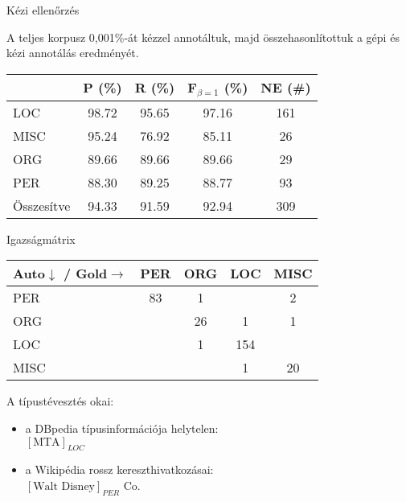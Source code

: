 \documentclass[utf8x,t]{beamer}
\begin{document}
\begin{frame}{Kézi ellenőrzés}

\bigskip

A teljes korpusz 0,001\%-át kézzel annotáltuk, majd összehasonlítottuk a gépi és kézi annotálás eredményét.

\bigskip

\begin{tabular}{lcccc}
\toprule
& P (\%) &  R (\%) & F$_{\beta=1}$ (\%) & NE (\#) \\
\midrule
LOC     &   98.72 &  95.65 &  97.16 & 161 \\
MISC    &   95.24 &  76.92 &  85.11 & 26 \\
ORG     &   89.66 &  89.66 &  89.66 & 29 \\
PER     &   88.30 &  89.25 &  88.77 & 93 \\
\midrule
Összesítve &   94.33 &  91.59 &  92.94 & 309 \\
\bottomrule
\end{tabular} 

\end{frame}

\begin{frame}{Igazságmátrix}

\bigskip

\begin{tabular}{l@{\hspace{0.5em}}|@{\hspace{0.5em}}cccc}
\toprule
Auto$\downarrow$ / Gold$\rightarrow$ & PER & ORG & LOC & MISC \\
\midrule
PER & 83 & 1 & & 2 \\
ORG &  & 26 & 1 & 1 \\
LOC &  & 1 & 154 & \\
MISC &  &  & 1 & 20 \\
\bottomrule
\end{tabular}

\bigskip

A típustévesztés okai:

\begin{itemize}
\item a DBpedia típusinformációja helytelen: \\ $[\mbox{MTA}]_{LOC}$
\item a Wikipédia rossz kereszthivatkozásai: \\ $[\mbox{Walt Disney}]_{PER}$ Co.
\end{itemize}

\end{frame}
\end{document}
